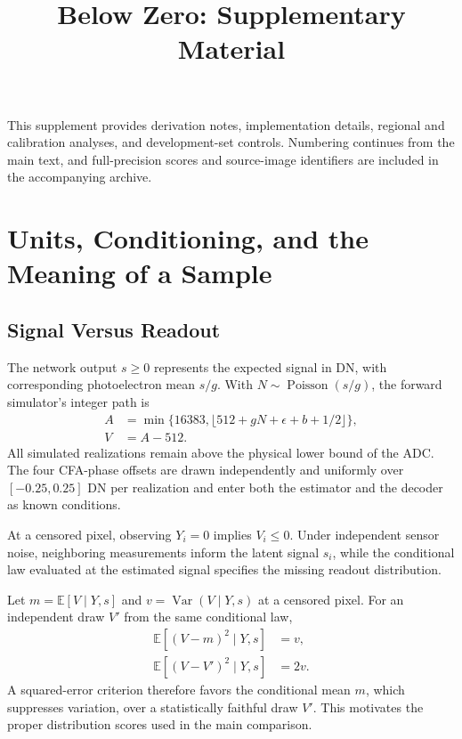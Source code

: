 \documentclass[10pt,twocolumn,journal]{IEEEtran}
\begin{document}
\title{Below Zero: Supplementary Material}
\author{\BZAuthorBlockEN}
\maketitle
\thispagestyle{fancy}

This supplement provides derivation notes, implementation details, regional and calibration analyses, and development-set controls. Numbering continues from the main text, and full-precision scores and source-image identifiers are included in the accompanying archive.

\section{Units, Conditioning, and the Meaning of a Sample}
\subsection{Signal Versus Readout}
The network output $s\geq0$ represents the expected signal in DN, with corresponding photoelectron mean $s/g$. With $N\sim\operatorname{Poisson}(s/g)$, the forward simulator's integer path is
\begin{equation}
\begin{aligned}
A&=\min\{16383,\lfloor512+gN+\epsilon+b+1/2\rfloor\},\\
V&=A-512.
\end{aligned}
\end{equation}
All simulated realizations remain above the physical lower bound of the ADC. The four CFA-phase offsets are drawn independently and uniformly over $[-0.25,0.25]$ DN per realization and enter both the estimator and the decoder as known conditions.

At a censored pixel, observing $Y_i=0$ implies $V_i\leq0$. Under independent sensor noise, neighboring measurements inform the latent signal $s_i$, while the conditional law evaluated at the estimated signal specifies the missing readout distribution.

Let $m=\mathbb E[V\mid Y,s]$ and $v=\operatorname{Var}(V\mid Y,s)$ at a censored pixel. For an independent draw $V'$ from the same conditional law,
\begin{align}
\mathbb E[(V-m)^2\mid Y,s]&=v,\\
\mathbb E[(V-V')^2\mid Y,s]&=2v.
\end{align}
A squared-error criterion therefore favors the conditional mean $m$, which suppresses variation, over a statistically faithful draw $V'$. This motivates the proper distribution scores used in the main comparison.
\end{document}
